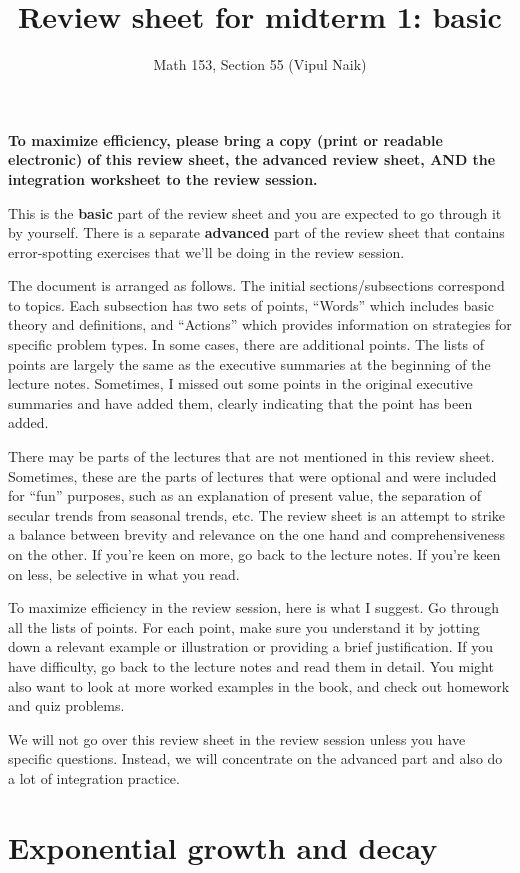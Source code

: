 \documentclass[10pt]{amsart}
\title{Review sheet for midterm 1: basic}
\author{Math 153, Section 55 (Vipul Naik)}
\begin{document}
\maketitle

{\bf To maximize efficiency, please bring a copy (print or readable
electronic) of this review sheet, the advanced review sheet, AND the
integration worksheet to the review session.}

This is the {\bf basic} part of the review sheet and you are expected
to go through it by yourself. There is a separate {\bf advanced} part of
the review sheet that contains error-spotting exercises that we'll be
doing in the review session.

The document is arranged as follows. The initial sections/subsections
correspond to topics. Each subsection has two sets of points,
``Words'' which includes basic theory and definitions, and ``Actions''
which provides information on strategies for specific problem
types. In some cases, there are additional points. The lists of points
are largely the same as the executive summaries at the beginning of
the lecture notes. Sometimes, I missed out some points in the original
executive summaries and have added them, clearly indicating that the
point has been added.

There may be parts of the lectures that are not mentioned in this
review sheet. Sometimes, these are the parts of lectures that were
optional and were included for ``fun'' purposes, such as an
explanation of present value, the separation of secular trends from
seasonal trends, etc. The review sheet is an attempt to strike a
balance between brevity and relevance on the one hand and
comprehensiveness on the other. If you're keen on more, go back to the
lecture notes. If you're keen on less, be selective in what you read.

To maximize efficiency in the review session, here is what I
suggest. Go through all the lists of points. For each point, make sure
you understand it by jotting down a relevant example or illustration
or providing a brief justification. If you have difficulty, go back to
the lecture notes and read them in detail. You might also want to look
at more worked examples in the book, and check out homework and quiz
problems.

We will not go over this review sheet in the review session unless you
have specific questions. Instead, we will concentrate on the advanced
part and also do a lot of integration practice.

\section{Exponential growth and decay}
\end{document}
